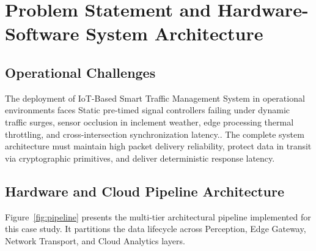 \section{Problem Statement and Hardware-Software System Architecture}

\subsection{Operational Challenges}
The deployment of IoT-Based Smart Traffic Management System in operational environments faces Static pre-timed signal controllers failing under dynamic traffic surges, sensor occlusion in inclement weather, edge processing thermal throttling, and cross-intersection synchronization latency.. The complete system architecture must maintain high packet delivery reliability, protect data in transit via cryptographic primitives, and deliver deterministic response latency.

\subsection{Hardware and Cloud Pipeline Architecture}
Figure~\ref{fig:pipeline} presents the multi-tier architectural pipeline implemented for this case study. It partitions the data lifecycle across Perception, Edge Gateway, Network Transport, and Cloud Analytics layers.


